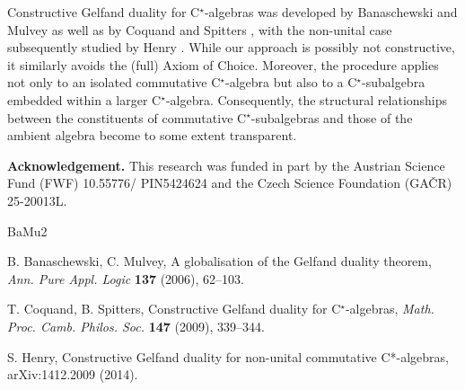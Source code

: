 \documentclass[a4paper]{article} %
\begin{document}
Constructive Gelfand duality for {\rm C}$^\star$-algebras was developed by Banaschewski and Mulvey \cite{BaMu} as well as by Coquand and Spitters \cite{CoSp}, with the non-unital case subsequently studied by Henry \cite{Hen}. While our approach is possibly not constructive, it similarly avoids the (full) Axiom of Choice. Moreover, the procedure applies not only to an isolated commutative {\rm C}$^\star$-algebra but also to a {\rm C}$^\star$-subalgebra embedded within a larger {\rm C}$^\star$-algebra. Consequently, the structural relationships between the constituents of commutative {\rm C}$^\star$-subalgebras and those of the ambient algebra become to some extent transparent.

{\bf Acknowledgement.} This research was funded in part by the Austrian Science Fund (FWF) 10.55776/ PIN5424624 and the Czech Science Foundation (GA\v CR) 25-20013L.

\begin{thebibliography}{BaMu2}

 B. Banaschewski, C. Mulvey,
A globalisation of the Gelfand duality theorem,
{\it Ann. Pure Appl. Logic} {\bf 137} (2006), 62--103.

 T. Coquand, B. Spitters,
Constructive Gelfand duality for {\rm C}$^\star$-algebras,
{\it Math. Proc. Camb. Philos. Soc.} {\bf 147} (2009), 339--344.

 S. Henry,
Constructive Gelfand duality for non-unital commutative C*-algebras,
arXiv:1412.2009 (2014).

\end{thebibliography}
\end{document}
